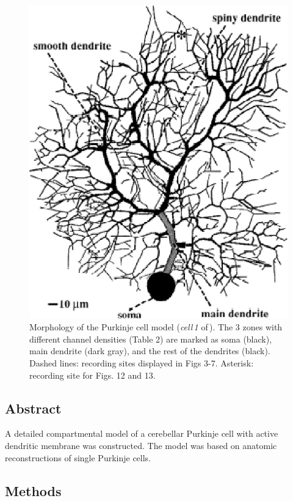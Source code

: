\documentclass[12pt]{article}
\begin{document}
\begin{figure}[h]
\centering
   \includegraphics[scale=0.4]{figures/Fig.1.1.eps}
   \caption{Morphology of the Purkinje cell model ({\it cell\,1} of\,\cite{Rapp-P:1994qf}).  The 3 zones with different channel densities (Table 2) are marked
as soma (black), main dendrite (dark gray), and the rest of the dendrites
(black). Dashed lines: recording sites displayed in Figs 3-7. Asterisk: recording
site for Figs. 12 and 13.}
   \label{fig:DS1.1}
\end{figure}

\subsection*{Abstract}

A detailed compartmental model of a cerebellar Purkinje cell with active dendritic membrane was constructed. The model was based on anatomic reconstructions of single Purkinje cells.

\subsection*{Methods}
\end{document}
